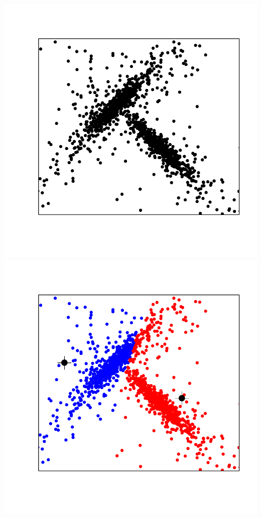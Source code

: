 \documentclass[landscape,footrule]{foils}
\begin{document}

\centerline{\includegraphics[scale=0.8]{kmeans-failure-1}\hspace*{-1.7cm}\includegraphics[scale=0.8]{kmeans-failure-2}}
\vspace*{-2cm}
\end{document}
